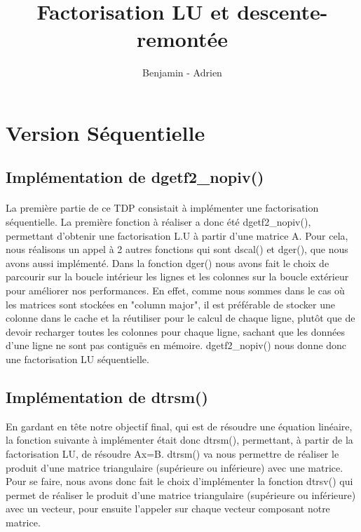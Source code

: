 \documentclass{article}
\title{Factorisation LU et descente-remontée}
\author{Benjamin \bsc{Angelaud} - Adrien \bsc{Guilbaud}}
\begin{document}
\maketitle

\section{Version Séquentielle}
\subsection{Implémentation de dgetf2\_nopiv()}
\paragraph{}La première partie de ce TDP consistait à implémenter une factorisation séquentielle. La première fonction à réaliser a donc été dgetf2\_nopiv(), permettant d'obtenir une factorisation L.U à partir d'une matrice A.  Pour cela, nous réalisons un appel à 2 autres fonctions qui sont dscal() et dger(), que nous avons aussi implémenté. Dans la fonction dger() nous avons fait le choix de parcourir sur la boucle intérieur les lignes et les colonnes sur la boucle extérieur pour améliorer nos performances. En effet, comme nous sommes dans le cas où les matrices sont stockées en "column major", il est préférable de stocker une colonne dans le cache et la réutiliser pour le calcul de chaque ligne, plutôt que de devoir recharger toutes les colonnes pour chaque ligne, sachant que les données d'une ligne ne sont pas contiguës en mémoire. dgetf2\_nopiv() nous donne donc une factorisation LU séquentielle.

\subsection{Implémentation de dtrsm()}En gardant en tête notre objectif final, qui est de résoudre une équation linéaire, la fonction suivante à implémenter était donc dtrsm(), permettant, à partir de la factorisation LU, de résoudre Ax=B. dtrsm() va nous permettre de réaliser le produit d'une matrice triangulaire (supérieure ou inférieure) avec une matrice. Pour se faire, nous avons donc fait le choix d'implémenter la fonction dtrsv() qui permet de réaliser le produit d'une matrice triangulaire (supérieure ou inférieure) avec un vecteur, pour ensuite l'appeler sur chaque vecteur composant notre matrice.
\end{document}
